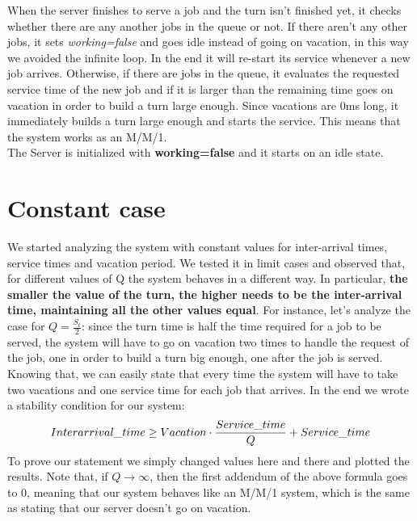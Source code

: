 \documentclass{article}
\begin{document}
    When the server finishes to serve a job and the turn isn't finished yet, it checks whether there are any another jobs in the queue or not. If there aren't any other jobs, it sets \textit{working=false} and goes idle instead of going on vacation, in this way we avoided the infinite loop. In the end it will re-start its service whenever a new job arrives.
    Otherwise, if there are jobs in the queue, it evaluates the requested service time of the new job and if it is larger than the remaining time goes on vacation in order to build a turn large enough. Since vacations are 0ms long, it immediately builds a turn large enough and starts the service. This means that the system works as an M/M/1.\\
    
    The Server is initialized with \textbf{working=false} and it starts on an idle state.

    \newpage
    
    
    
\newpage

\section{Constant case}
    
    We started analyzing the system with constant values for inter-arrival times, service times and vacation period. We tested it in limit cases and observed that, for different values of Q the system behaves in a different way. In particular, \textbf{the smaller the value of the turn, the higher needs to be the inter-arrival time, maintaining all the other values equal}. For instance, let's analyze the case for $Q =\frac{S_t}{2}$: since the turn time is half the time required for a job to be served, the system will have to go on vacation two times to handle the request of the job, one in order to build a turn big enough, one after the job is served. Knowing that, we can easily state that every time the system will have to take two vacations and one service time for each job that arrives.
    \newline
    In the end we wrote a stability condition for our system: \[Inter\-arrival\_time \ge Vacation \cdot \frac{Service\_time}{Q} + Service\_time \]
    To prove our statement we simply changed values here and there and plotted the results.
    Note that, if $Q \rightarrow \infty$, then the first addendum of the above formula goes to 0, meaning that our system behaves like an M/M/1 system, which is the same as stating that our server doesn't go on vacation.
\end{document}
